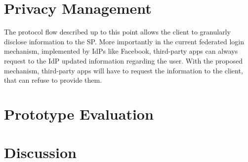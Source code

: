 \section{Privacy Management}

The protocol flow described up to this point allows the client to granularly disclose information to the SP. More importantly in the current federated login mechanism, implemented by IdPs like Facebook, third-party apps can always request to the IdP updated information regarding the user. With the proposed mechanism, third-party apps will have to request the information to the client, that can refuse to provide them.

\section{Prototype Evaluation}

\section{Discussion}
